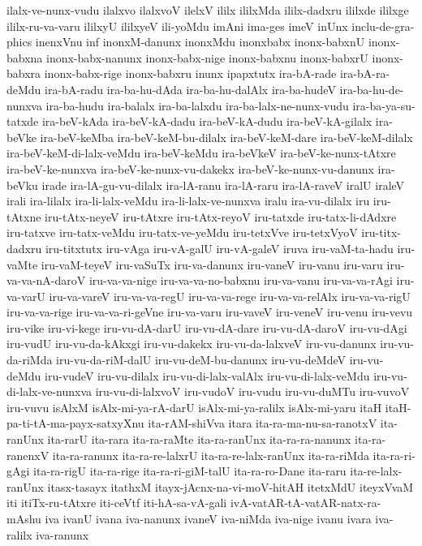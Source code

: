 {ilalx-ve-nunx-vudu
ilalxvo
ilalxvoV
ilelxV
ililx
ililxMda
ililx-dadxru
ililxde
ililxge
ililx-ru-va-varu
ililxyU
ililxyeV
ili-yoMdu
imAni
ima-ges
imeV
inUnx
inclu-de-gra-phics
inenxVnu
inf
inonxM-danunx
inonxMdu
inonxbabx
inonx-babxnU
inonx-babxna
inonx-babx-nanunx
inonx-babx-nige
inonx-babxnu
inonx-babxrU
inonx-babxra
inonx-babx-rige
inonx-babxru
inunx
ipapxtutx
ira-bA-rade
ira-bA-ra-deMdu
ira-bA-radu
ira-ba-hu-dAda
ira-ba-hu-dalAlx
ira-ba-hudeV
ira-ba-hu-de-nunxva
ira-ba-hudu
ira-balalx
ira-ba-lalxdu
ira-ba-lalx-ne-nunx-vudu
ira-ba-ya-su-tatxde
ira-beV-kAda
ira-beV-kA-dadu
ira-beV-kA-dudu
ira-beV-kA-gilalx
ira-beVke
ira-beV-keMba
ira-beV-keM-bu-dilalx
ira-beV-keM-dare
ira-beV-keM-dilalx
ira-beV-keM-di-lalx-veMdu
ira-beV-keMdu
ira-beVkeV
ira-beV-ke-nunx-tAtxre
ira-beV-ke-nunxva
ira-beV-ke-nunx-vu-dakekx
ira-beV-ke-nunx-vu-danunx
ira-beVku
irade
ira-lA-gu-vu-dilalx
ira-lA-ranu
ira-lA-raru
ira-lA-raveV
iralU
iraleV
irali
ira-lilalx
ira-li-lalx-veMdu
ira-li-lalx-ve-nunxva
iralu
ira-vu-dilalx
iru
iru-tAtxne
iru-tAtx-neyeV
iru-tAtxre
iru-tAtx-reyoV
iru-tatxde
iru-tatx-li-dAdxre
iru-tatxve
iru-tatx-veMdu
iru-tatx-ve-yeMdu
iru-tetxVve
iru-tetxVyoV
iru-titx-dadxru
iru-titxtutx
iru-vAga
iru-vA-galU
iru-vA-galeV
iruva
iru-vaM-ta-hadu
iru-vaMte
iru-vaM-teyeV
iru-vaSuTx
iru-va-danunx
iru-vaneV
iru-vanu
iru-varu
iru-va-va-nA-daroV
iru-va-va-nige
iru-va-va-no-babxnu
iru-va-vanu
iru-va-va-rAgi
iru-va-varU
iru-va-vareV
iru-va-va-regU
iru-va-va-rege
iru-va-va-relAlx
iru-va-va-rigU
iru-va-va-rige
iru-va-va-ri-geVne
iru-va-varu
iru-vaveV
iru-veneV
iru-venu
iru-vevu
iru-vike
iru-vi-kege
iru-vu-dA-darU
iru-vu-dA-dare
iru-vu-dA-daroV
iru-vu-dAgi
iru-vudU
iru-vu-da-kAkxgi
iru-vu-dakekx
iru-vu-da-lalxveV
iru-vu-danunx
iru-vu-da-riMda
iru-vu-da-riM-dalU
iru-vu-deM-bu-danunx
iru-vu-deMdeV
iru-vu-deMdu
iru-vudeV
iru-vu-dilalx
iru-vu-di-lalx-valAlx
iru-vu-di-lalx-veMdu
iru-vu-di-lalx-ve-nunxva
iru-vu-di-lalxvoV
iru-vudoV
iru-vudu
iru-vu-duMTu
iru-vuvoV
iru-vuvu
isAlxM
isAlx-mi-ya-rA-darU
isAlx-mi-ya-ralilx
isAlx-mi-yaru
itaH
itaH-pa-ti-tA-ma-payx-satxyXnu
ita-rAM-shiVva
itara
ita-ra-ma-nu-sa-ranotxV
ita-ranUnx
ita-rarU
ita-rara
ita-ra-raMte
ita-ra-ranUnx
ita-ra-ra-nanunx
ita-ra-ranenxV
ita-ra-ranunx
ita-ra-re-lalxrU
ita-ra-re-lalx-ranUnx
ita-ra-riMda
ita-ra-ri-gAgi
ita-ra-rigU
ita-ra-rige
ita-ra-ri-giM-talU
ita-ra-ro-Dane
ita-raru
ita-re-lalx-ranUnx
itasx-tasayx
itathxM
itayx-jAcnx-na-vi-moV-hitAH
itetxMdU
iteyxVvaM
iti
itiTx-ru-tAtxre
iti-ceVtf
iti-hA-sa-vA-gali
ivA-vatAR-tA-vatAR-natx-ra-mAshu
iva
ivanU
ivana
iva-nanunx
ivaneV
iva-niMda
iva-nige
ivanu
ivara
iva-ralilx
iva-ranunx
}
